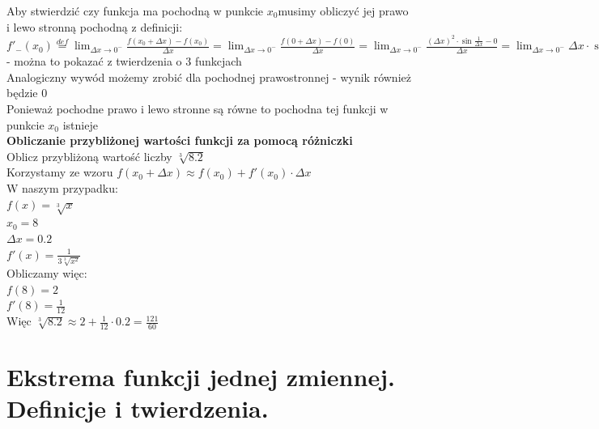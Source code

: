 \documentclass[12pt]{article}
\begin{document}
	\noindent Aby stwierdzić czy funkcja ma pochodną w punkcie $x_{0}$musimy obliczyć jej prawo i lewo stronną pochodną z definicji: \\

	\noindent $f'_{-}(x_{0}) \stackrel{def}{=} \lim_{\Delta x \to 0^{-}} \frac{f(x_{0} + \Delta x) - f(x_{0})}{\Delta x} = \lim_{\Delta x \to 0^{-}} \frac{f(0 + \Delta x) - f(0)}{\Delta x} = \lim_{\Delta x \to 0^{-}} \frac{(\Delta x)^2 \cdot \sin{\frac{1}{\Delta x}} - 0}{\Delta x}
							= \lim_{\Delta x \to 0^{-}} \Delta x \cdot \sin{\frac{1}{\Delta x}} = 0$ - można to pokazać z twierdzenia o 3 funkcjach \\

	\noindent Analogiczny wywód możemy zrobić dla pochodnej prawostronnej - wynik również będzie 0 \\

	\noindent Ponieważ pochodne prawo i lewo stronne są równe to pochodna tej funkcji w punkcie $x_{0}$ istnieje \\


	\noindent \textbf{Obliczanie przybliżonej wartości funkcji za pomocą różniczki} \\

	\noindent Oblicz przybliżoną wartość liczby $\sqrt[3]{8.2}$ \\

	\noindent Korzystamy ze wzoru $f(x_{0} + \Delta x) \approx f(x_{0}) + f'(x_{0}) \cdot \Delta x$ \\

	\noindent W naszym przypadku: \\
	$f(x) = \sqrt[3]{x}$ \\
	$x_{0} = 8$ \\
	$\Delta x = 0.2$ \\
	$f'(x) = \frac{1}{3\sqrt[3]{x^2}}$ \\

	\noindent Obliczamy więc: \\
	$f(8) = 2$ \\
	$f'(8) = \frac{1}{12}$ \\

	\noindent Więc $\sqrt[3]{8.2} \approx 2 + \frac{1}{12} \cdot 0.2 = \frac{121}{60}$

    \newpage

    \section{Ekstrema funkcji jednej zmiennej. Definicje i twierdzenia.}
\end{document}
